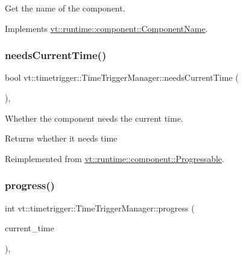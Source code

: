 Get the name of the component. 



Implements \hyperlink{structvt_1_1runtime_1_1component_1_1_component_name_a33c06229bb605a2b2ceff68830d6d773}{vt\+::runtime\+::component\+::\+Component\+Name}.

\mbox{\label{structvt_1_1timetrigger_1_1_time_trigger_manager_a2e65cfcbbbb1224b08263996b0fb1eff}} 
\subsubsection{\texorpdfstring{needs\+Current\+Time()}{needsCurrentTime()}}
{\footnotesize\ttfamily bool vt\+::timetrigger\+::\+Time\+Trigger\+Manager\+::needs\+Current\+Time (\begin{DoxyParamCaption}{ }\end{DoxyParamCaption})\hspace{0.3cm}{\ttfamily [override]}, {\ttfamily [virtual]}}



Whether the component needs the current time. 

\begin{DoxyReturn}{Returns}
whether it needs time 
\end{DoxyReturn}


Reimplemented from \hyperlink{structvt_1_1runtime_1_1component_1_1_progressable_a86dd4c58e43f7dbf6bd67f7a8e6df088}{vt\+::runtime\+::component\+::\+Progressable}.

\mbox{\label{structvt_1_1timetrigger_1_1_time_trigger_manager_a15cc796e1f07dbf32c04b3fb3f3ce06c}} 
\subsubsection{\texorpdfstring{progress()}{progress()}}
{\footnotesize\ttfamily int vt\+::timetrigger\+::\+Time\+Trigger\+Manager\+::progress (\begin{DoxyParamCaption}\item[{\hyperlink{namespacevt_a2b9f28078dc309ad0706b69ded743e69}{Time\+Type}}]{current\+\_\+time }\end{DoxyParamCaption})\hspace{0.3cm}{\ttfamily [override]}, {\ttfamily [virtual]}}



